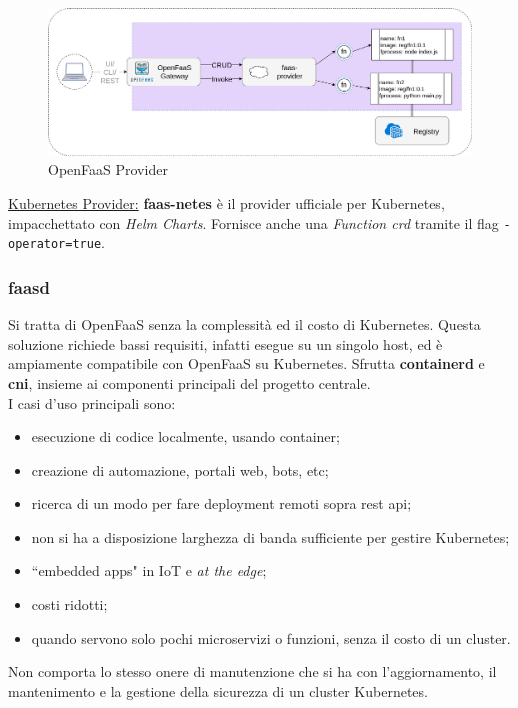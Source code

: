 \documentclass[12pt,a4paper,openany,twoside]{book}
\begin{document}
\begin{figure}[ht]
    \centering
    \includegraphics[width=\linewidth]{figures/OpenFaaS_provider.pdf}
    \caption{OpenFaaS Provider}
    \label{fig:openfaas-provider}
\end{figure}

\noindent
\underline{Kubernetes Provider:} \textbf{faas-netes} è il provider ufficiale per Kubernetes, impacchettato con \textit{Helm Charts}. Fornisce anche una \textit{Function \ac{crd}} tramite il flag \texttt{-operator=true}.

\subsubsection{faasd}

Si tratta di OpenFaaS senza la complessità ed il costo di Kubernetes. Questa soluzione richiede bassi requisiti, infatti esegue su un singolo host, ed è ampiamente compatibile con OpenFaaS su Kubernetes.
Sfrutta \textbf{containerd} e \textbf{\ac{cni}}, insieme ai componenti principali del progetto centrale.
\\
I casi d'uso principali sono:
\begin{itemize}
    \item esecuzione di codice localmente, usando container;
    
    \item creazione di automazione, portali web, bots, etc;
    
    \item ricerca di un modo per fare deployment remoti sopra \ac{rest} \ac{api};
    
    \item non si ha a disposizione larghezza di banda sufficiente per gestire Kubernetes;
    
    \item ``embedded apps" in \ac{IoT} e \textit{at the edge};
    
    \item costi ridotti;
    
    \item quando servono solo pochi microservizi o funzioni, senza il costo di un cluster.
\end{itemize}
Non comporta lo stesso onere di manutenzione che si ha con l'aggiornamento, il mantenimento e la gestione della sicurezza di un cluster Kubernetes.
\end{document}
